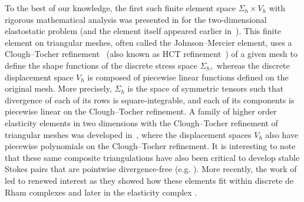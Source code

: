 \documentclass[12pt]{amsart}
\numberwithin{equation}{section}
\theoremstyle{definition}
\theoremstyle{remark}
\renewcommand{\(}{\bigl(}
\renewcommand{\)}{\bigr)}
\begin{document}
To the best of our knowledge, the first such finite element space $\Sigma_h \times V_h$ with rigorous mathematical analysis was presented in \cite{johnson1978some} for the two-dimensional elastostatic problem (and the element itself appeared earlier in~\cite{Watwood1968AnES}). This  finite element on triangular meshes, often called the Johnson--Mercier element, uses a Clough--Tocher  refinement~\cite{clough1965finite,ciarlet2009intrinsic} (also known as
HCT refinement~\cite{Ciarl91})
of a given mesh to define the shape functions of the discrete stress space $\Sigma_h,$ whereas the discrete displacement space $V_h$ is composed of piecewise linear functions defined on the original mesh. More precisely, $\Sigma_h$ is the space of symmetric tensors such that divergence of each of its rows is square-integrable, and each of its components is piecewise linear on the Clough--Tocher refinement. A family of higher order elasticity elements in two dimensions with the Clough--Tocher refinement of triangular meshes was developed in~\cite{arnold1984family}, where the  displacement spaces $V_h$ also have piecewise polynomials on the Clough--Tocher refinement. It is interesting to note that these same composite triangulations have also been critical to develop stable Stokes pairs that are pointwise divergence-free (e.g. \cite{ArnolQin92,Zhang-barycentric:2005}). More recently, the work of \cite{Christiansen-Hu:2018} led to renewed interest as they showed how these elements fit within discrete de Rham complexes and later in the elasticity complex \cite{christiansen2019finite}. 
\end{document}
